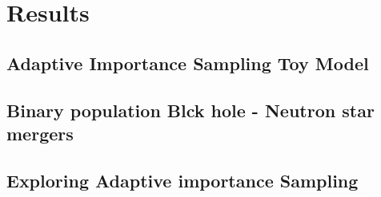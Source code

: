 \chapter{Results}
\label{ch:results}


\section{Adaptive Importance Sampling Toy Model}

\section{Binary population Blck hole - Neutron star mergers}

\section{Exploring Adaptive importance Sampling}

